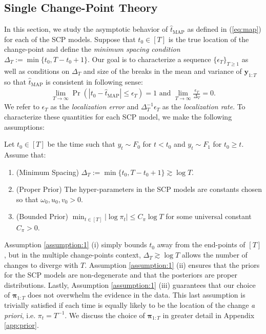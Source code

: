 \subsection{Single Change-Point Theory}
\label{sec:localization}
 
In this section, we study the asymptotic behavior of $\hat{t}_{\text{MAP}}$ as defined in (\ref{eq:map}) for each of the SCP models. Suppose that $t_0 \in [T]$ is the true location of the change-point and define the \textit{minimum spacing condition} $\Delta_T := \min\{t_0,T-t_0 + 1\}$. Our goal is to characterize a sequence $\{\epsilon_T\}_{T\geq 1}$ as well as conditions on $\Delta_T$ and size of the breaks in the mean and variance of $\mathbf{y}_{1:T}$ so that $\hat{t}_{\text{MAP}}$ is consistent in following sense:
\begin{align}
    \lim_{T\to\infty} \Pr\left(|t_0 - \hat{t}_{\text{MAP}}| \leq \epsilon_T\right) = 1 \text{ and } \lim_{T\to\infty} \frac{\epsilon_T}{\Delta_T} = 0. \label{def:loc-rate}
\end{align}
We refer to $\epsilon_T$ as the \textit{localization error} and $\Delta_T^{-1}\epsilon_T$ as the \textit{localization rate}. To characterize these quantities for each SCP model, we make the following assumptions:
\begin{assumption}\label{assumption:1}
    Let $t_0 \in [T]$ be the time such that $y_t \sim F_0$ for $t < t_0$ and $y_t \sim F_1$ for $t_0 \geq t$. Assume that: \vspace{-10pt}
    \begin{enumerate}[label=\normalfont(\roman*)]
        \item (Minimum Spacing) $\Delta_T:=\min\{t_0,T-t_0 + 1\} \gtrsim \log T$. \vspace{-5pt}
        \item (Proper Prior) The hyper-parameters in the SCP models are constants chosen so that $\omega_0, u_0, v_0 > 0$. \vspace{-5pt}
        \item (Bounded Prior) $\min_{t\in[T]} |\log \pi_{t}| \leq C_\pi \log T$ for some universal constant $C_\pi > 0$.
    \end{enumerate}
\end{assumption}
\vspace{-10pt}
Assumption \ref{assumption:1} (i) simply bounds $t_0$ away from the end-points of $[T]$, but in the multiple change-points context, $\Delta_T \gtrsim \log T$ allows the number of changes to diverge with $T$. Assumption \ref{assumption:1} (ii) ensures that the priors for the SCP models are non-degenerate and that the posteriors are proper distributions. Lastly, Assumption \ref{assumption:1} (iii) guarantees that our choice of $\boldsymbol{\pi}_{1:T}$ does not overwhelm the evidence in the data. This last assumption is trivially satisfied if each time is equally likely to be the location of the change \textit{a priori}, i.e. $\pi_t = T^{-1}$. We discuss the choice of $\boldsymbol{\pi}_{1:T}$ in greater detail in Appendix \ref{app:prior}. 

